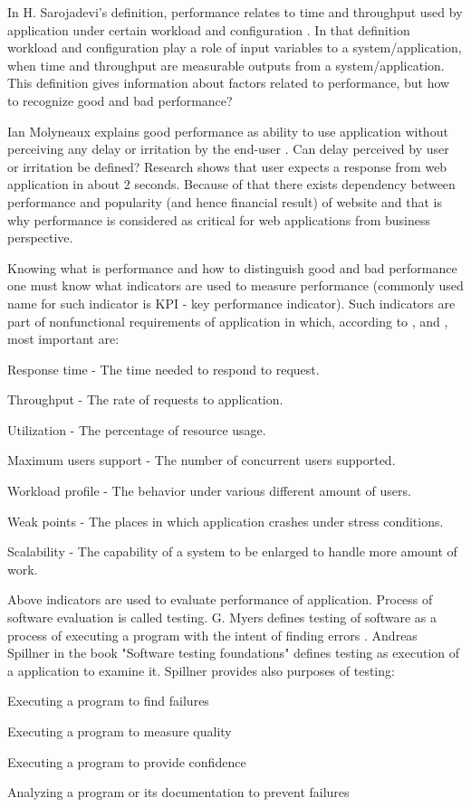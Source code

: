 \documentclass[12pt,a4paper]{article}
\let\tempone\itemize
\let\temptwo\enditemize
\renewenvironment{itemize}{\tempone\addtolength{\itemsep}{-0.4\baselineskip}}{\temptwo}
\begin{document}
In H. Sarojadevi's definition, performance relates to time and throughput used by application under certain workload and configuration \cite{petmethodsandtools}. In that definition workload and configuration play a role of input variables to a system/application, when time and throughput are measurable outputs from a system/application. This definition gives information about factors related to performance, but how to recognize good and bad performance?

Ian Molyneaux explains good performance as ability to use application without perceiving any delay or irritation by the end-user \cite{artperformance}. Can delay perceived by user or irritation be defined? Research \cite{howlong} shows that user expects a response from web application in about 2 seconds. Because of that there exists dependency between performance and popularity (and hence financial result) of website and that is why performance is  considered as critical for web applications from business perspective\cite{architectingperformance}. 

Knowing what is performance and how to distinguish good and bad performance one must know what indicators are used to measure performance (commonly used name for such indicator is KPI - key performance indicator). Such indicators are part of nonfunctional requirements of application in which, according to \cite{artperformance}, \cite{analysisofpet} and \cite{petmethodsandtools},  most important are:  
\begin{itemize}
\item Response time - The time needed to respond to request.
\item Throughput - The rate of requests to application.
\item Utilization - The percentage of resource usage.
\item Maximum users support - The number of concurrent users supported.
\item Workload profile - The behavior under various different amount of users.
\item Weak points - The places in which application crashes under stress conditions.
\item Scalability - The capability of a system to be enlarged to handle more amount of work.
\end{itemize}

Above indicators are used to evaluate performance of application. Process of software evaluation is called testing. G. Myers defines testing of software as a process of executing a program with the intent of finding errors \cite{arttest}. Andreas Spillner in the book "Software testing foundations" \cite{testfoundations} defines testing as execution of a application to examine it. Spillner provides also purposes of testing: 
\begin{itemize}
\item Executing a program to find failures
\item Executing a program to measure quality
\item Executing a program to provide confidence 
\item Analyzing a program or its documentation to prevent failures
\end{itemize}
\end{document}
